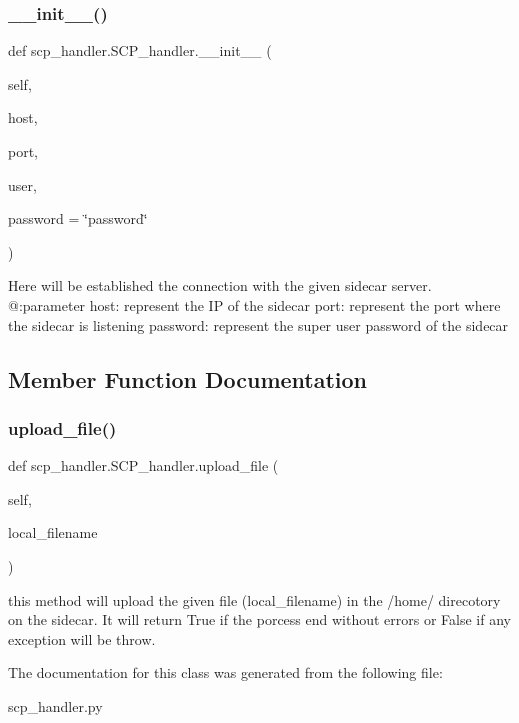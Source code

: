 \subsubsection{\texorpdfstring{\+\_\+\+\_\+init\+\_\+\+\_\+()}{\_\_init\_\_()}}
{\footnotesize\ttfamily def scp\+\_\+handler.\+S\+C\+P\+\_\+handler.\+\_\+\+\_\+init\+\_\+\+\_\+ (\begin{DoxyParamCaption}\item[{}]{self,  }\item[{}]{host,  }\item[{}]{port,  }\item[{}]{user,  }\item[{}]{password = {\ttfamily \char`\"{}password\char`\"{}} }\end{DoxyParamCaption})}

\begin{DoxyVerb}Here will be established the connection with the given sidecar server.
@:parameter
host: represent the IP of the sidecar
port: represent the port where the sidecar is listening
password: represent the super user password of the sidecar
\end{DoxyVerb}
 

\subsection{Member Function Documentation}
\mbox{\label{classscp__handler_1_1SCP__handler_a4441d5d1a6dbc37f394ba21a1d8a0ee2}} 
\subsubsection{\texorpdfstring{upload\+\_\+file()}{upload\_file()}}
{\footnotesize\ttfamily def scp\+\_\+handler.\+S\+C\+P\+\_\+handler.\+upload\+\_\+file (\begin{DoxyParamCaption}\item[{}]{self,  }\item[{}]{local\+\_\+filename }\end{DoxyParamCaption})}

\begin{DoxyVerb}this method will upload the given file (local_filename) in the /home/
direcotory on the sidecar. It will return True if the porcess end without
errors or False if any exception will be throw.\end{DoxyVerb}
 

The documentation for this class was generated from the following file\+:\begin{DoxyCompactItemize}
\item 
scp\+\_\+handler.\+py\end{DoxyCompactItemize}
